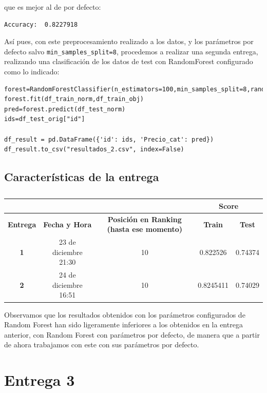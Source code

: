 \documentclass[a4paper,11pt]{article}
\begin{document}
que es mejor al de por defecto: 

\begin{verbatim}
Accuracy:  0.8227918
\end{verbatim}

Así pues, con este preprocesamiento realizado a los datos, y los parámetros por defecto salvo \texttt{min_samples_split=8}, procedemos a realizar una segunda entrega, realizando una clasificación de los datos de test con RandomForest configurado como lo indicado:

\begin{verbatim}
forest=RandomForestClassifier(n_estimators=100,min_samples_split=8,random_state=10)
forest.fit(df_train_norm,df_train_obj)
pred=forest.predict(df_test_norm)
ids=df_test_orig["id"]

df_result = pd.DataFrame({'id': ids, 'Precio_cat': pred})
df_result.to_csv("resultados_2.csv", index=False)
\end{verbatim}

\subsection{Características de la entrega}

\begin{table}[htbp]
	\caption{}\begin{center}
	\begin{tabular}{|c|c|c|c|c|}
		\hline
		\multicolumn{1}{|l|}{} & \textbf{} & \textbf{} & \multicolumn{ 2}{c|}{\textbf{Score}} \\ \hline
		\textbf{Entrega} & \textbf{Fecha y Hora} & \textbf{Posición en Ranking (hasta ese momento)} & \textbf{Train} & \textbf{Test} \\ \hline
		\textbf{1} & 23 de diciembre 21:30 & 10 & 0.822526 & 0.74374 \\ \hline
		\textbf{2} &  24 de diciembre  16:51 & 10 & 0.8245411 & 0.74029 \\ \hline
	\end{tabular}\end{center}
	\label{}
\end{table}


Observamos que los resultados obtenidos con los parámetros configurados de Random Forest han sido ligeramente inferiores a los obtenidos en la entrega anterior, con Random Forest con parámetros por defecto, de manera que a partir de ahora trabajamos con este con sus parámetros por defecto. 
\section{Entrega 3}
\end{document}
